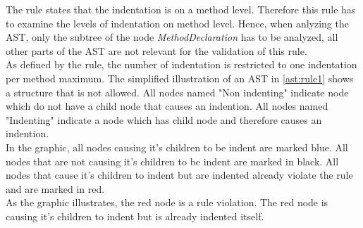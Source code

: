 The rule states that the indentation is on a method level. Therefore this rule has to examine the levels of indentation on method level. Hence, when anlyzing the \acf{AST}, only the subtree of the node \textit{MethodDeclaration} has to be analyzed, all other parts of the \acf{AST} are not relevant for the validation of this rule.
\\

As defined by the rule, the number of indentation is restricted to one indentation per method maximum. The simplified illustration of an \acf{AST} in \ref{ast:rule1} shows a structure that is not allowed. All nodes named "Non indenting" indicate node which do not have a child node that causes an indention. All nodes named "Indenting" indicate a node which has child node and therefore causes an indention.
\\

In the graphic, all nodes causing it's children to be indent are marked blue. All nodes that are not causing it's children to be indent are marked in black. 
All nodes that cause it's children to indent but are indented already violate the rule and are marked in red. 
\\

As the graphic illustrates, the red node is a rule violation. The red node is causing it's children to indent but is already indented itself. 
\\

\label{ast:rule1}

